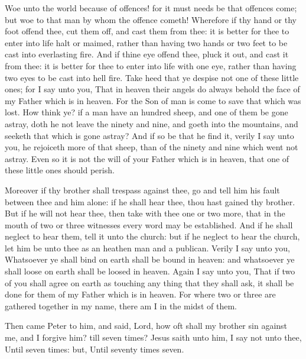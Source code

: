  Woe unto the world because of offences! for it must needs
be that offences come; but woe to that man by whom the offence cometh!
 Wherefore if thy hand or thy foot offend thee, cut them
off, and cast them from thee: it is better for thee to enter into life
halt or maimed, rather than having two hands or two feet to be cast into
everlasting fire.  And if thine eye offend thee, pluck it
out, and cast it from thee: it is better for thee to enter into life
with one eye, rather than having two eyes to be cast into hell fire.
 Take heed that ye despise not one of these little ones;
for I say unto you, That in heaven their angels do always behold the
face of my Father which is in heaven.  For the Son of man
is come to save that which was lost.  How think ye? if a
man have an hundred sheep, and one of them be gone astray, doth he not
leave the ninety and nine, and goeth into the mountains, and seeketh
that which is gone astray?  And if so be that he find it,
verily I say unto you, he rejoiceth more of that sheep, than of the
ninety and nine which went not astray.  Even so it is not
the will of your Father which is in heaven, that one of these little
ones should perish.

 Moreover if thy brother shall trespass against thee, go
and tell him his fault between thee and him alone: if he shall hear
thee, thou hast gained thy brother.  But if he will not
hear thee, then take with thee one or two more, that in the mouth of two
or three witnesses every word may be established.  And if
he shall neglect to hear them, tell it unto the church: but if he
neglect to hear the church, let him be unto thee as an heathen man and a
publican.  Verily I say unto you, Whatsoever ye shall bind
on earth shall be bound in heaven: and whatsoever ye shall loose on
earth shall be loosed in heaven.  Again I say unto you,
That if two of you shall agree on earth as touching any thing that they
shall ask, it shall be done for them of my Father which is in heaven.
 For where two or three are gathered together in my name,
there am I in the midst of them.

 Then came Peter to him, and said, Lord, how oft shall my
brother sin against me, and I forgive him? till seven times?
 Jesus saith unto him, I say not unto thee, Until seven
times: but, Until seventy times seven.

